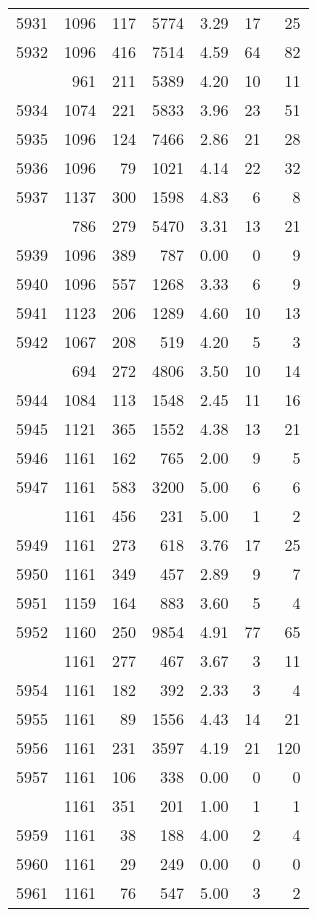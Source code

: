 \documentclass[
]{article}
\begin{document}
\begin{table}
\begin{tabular}[t]{lrrrrrr}
5931 & 1096 & 117 & 5774 & 3.29 & 17 & 25\\
5932 & 1096 & 416 & 7514 & 4.59 & 64 & 82\\
\addlinespace
5933 & 961 & 211 & 5389 & 4.20 & 10 & 11\\
5934 & 1074 & 221 & 5833 & 3.96 & 23 & 51\\
5935 & 1096 & 124 & 7466 & 2.86 & 21 & 28\\
5936 & 1096 & 79 & 1021 & 4.14 & 22 & 32\\
5937 & 1137 & 300 & 1598 & 4.83 & 6 & 8\\
\addlinespace
5938 & 786 & 279 & 5470 & 3.31 & 13 & 21\\
5939 & 1096 & 389 & 787 & 0.00 & 0 & 9\\
5940 & 1096 & 557 & 1268 & 3.33 & 6 & 9\\
5941 & 1123 & 206 & 1289 & 4.60 & 10 & 13\\
5942 & 1067 & 208 & 519 & 4.20 & 5 & 3\\
\addlinespace
5943 & 694 & 272 & 4806 & 3.50 & 10 & 14\\
5944 & 1084 & 113 & 1548 & 2.45 & 11 & 16\\
5945 & 1121 & 365 & 1552 & 4.38 & 13 & 21\\
5946 & 1161 & 162 & 765 & 2.00 & 9 & 5\\
5947 & 1161 & 583 & 3200 & 5.00 & 6 & 6\\
\addlinespace
5948 & 1161 & 456 & 231 & 5.00 & 1 & 2\\
5949 & 1161 & 273 & 618 & 3.76 & 17 & 25\\
5950 & 1161 & 349 & 457 & 2.89 & 9 & 7\\
5951 & 1159 & 164 & 883 & 3.60 & 5 & 4\\
5952 & 1160 & 250 & 9854 & 4.91 & 77 & 65\\
\addlinespace
5953 & 1161 & 277 & 467 & 3.67 & 3 & 11\\
5954 & 1161 & 182 & 392 & 2.33 & 3 & 4\\
5955 & 1161 & 89 & 1556 & 4.43 & 14 & 21\\
5956 & 1161 & 231 & 3597 & 4.19 & 21 & 120\\
5957 & 1161 & 106 & 338 & 0.00 & 0 & 0\\
\addlinespace
5958 & 1161 & 351 & 201 & 1.00 & 1 & 1\\
5959 & 1161 & 38 & 188 & 4.00 & 2 & 4\\
5960 & 1161 & 29 & 249 & 0.00 & 0 & 0\\
5961 & 1161 & 76 & 547 & 5.00 & 3 & 2\\

\end{tabular}
\end{table}
\end{document}
